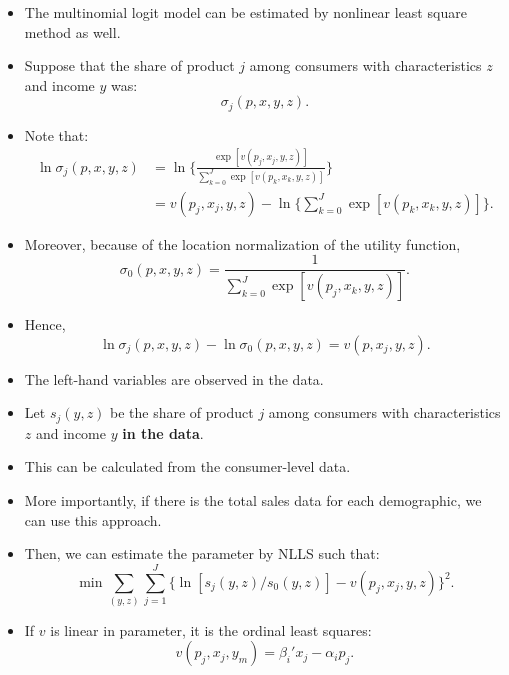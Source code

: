 \documentclass[
]{book}
\begin{document}
\begin{itemize}
\item
  The multinomial logit model can be estimated by nonlinear least square method as well.
\item
  Suppose that the share of product \(j\) among consumers with characteristics \(z\) and income \(y\) was:
  \begin{equation}
  \sigma_j(p, x, y, z).
  \end{equation}
\item
  Note that:
  \begin{equation}
  \begin{split}
  \ln \sigma_{j}(p, x, y, z)  &= \ln \Bigg\{ \frac{\exp[v(p_j, x_j, y, z) ]}{\sum_{k = 0}^J \exp[v(p_k, x_k, y, z)] }  \Bigg\}\\
  &= v(p_j, x_j, y, z) - \ln\Bigg\{ \sum_{k = 0}^J \exp[v(p_k, x_k, y, z)]  \Bigg\}.
  \end{split}
  \end{equation}
\item
  Moreover, because of the location normalization of the utility function,
  \begin{equation}
  \sigma_{0}(p, x, y, z) = \frac{1}{\sum_{k = 0}^J \exp[v(p_j, x_k, y, z)] }.
  \end{equation}
\item
  Hence,
  \begin{equation}
  \ln \sigma_{j}(p, x, y, z) - \ln \sigma_{0}(p, x, y, z) = v(p, x_j, y, z).
  \end{equation}
\item
  The left-hand variables are observed in the data.
\item
  Let \(s_j(y, z)\) be the share of product \(j\) among consumers with characteristics \(z\) and income \(y\) \textbf{in the data}.
\item
  This can be calculated from the consumer-level data.
\item
  More importantly, if there is the total sales data for each demographic, we can use this approach.
\item
  Then, we can estimate the parameter by NLLS such that:
  \begin{equation}
  \min \sum_{(y, z)} \sum_{j = 1}^J \{\ln[s_{j}(y, z)/s_{0}(y, z)] - v(p_j, x_j, y, z)\}^2.
  \end{equation}
\item
  If \(v\) is linear in parameter, it is the ordinal least squares:
  \begin{equation}
  v(p_j, x_j, y_m) = \beta_i' x_j - \alpha_i p_j.
  \end{equation}
\end{itemize}
\end{document}
